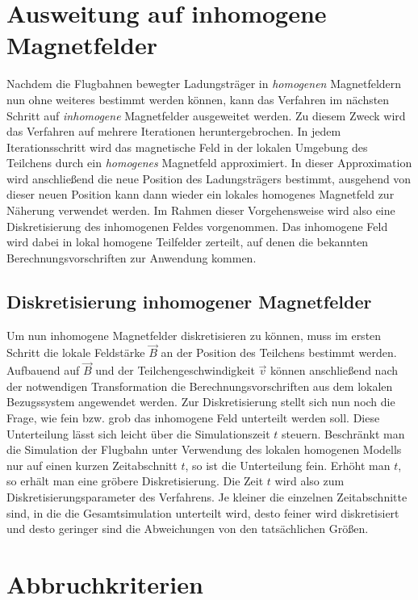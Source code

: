 \section{Ausweitung auf inhomogene Magnetfelder}

Nachdem die Flugbahnen bewegter Ladungstr\"ager in \textit{homogenen} Magnetfeldern nun ohne weiteres bestimmt werden k\"onnen, kann
das Verfahren im n\"achsten Schritt auf \textit{inhomogene} Magnetfelder ausgeweitet werden. Zu diesem Zweck wird das Verfahren
auf mehrere Iterationen heruntergebrochen. In jedem Iterationsschritt wird das magnetische Feld in der lokalen Umgebung des Teilchens
durch ein \textit{homogenes} Magnetfeld approximiert. In dieser Approximation wird anschlie{\ss}end die neue Position des
Ladungstr\"agers bestimmt, ausgehend von dieser neuen Position kann dann wieder ein lokales homogenes Magnetfeld zur N\"aherung
verwendet werden. Im Rahmen dieser Vorgehensweise wird also eine Diskretisierung des inhomogenen Feldes vorgenommen. Das inhomogene
Feld wird dabei in lokal homogene Teilfelder zerteilt, auf denen die bekannten Berechnungsvorschriften zur Anwendung kommen.

\subsection{Diskretisierung inhomogener Magnetfelder}

Um nun inhomogene Magnetfelder diskretisieren zu k\"onnen, muss im ersten Schritt die lokale Feldst\"arke \(\vec{B}\) an der Position
des Teilchens bestimmt werden. Aufbauend auf \(\vec{B}\) und der Teilchengeschwindigkeit \(\vec{v}\) k\"onnen anschlie{\ss}end nach
der notwendigen Transformation die Berechnungsvorschriften aus dem lokalen Bezugssystem angewendet werden. Zur Diskretisierung stellt
sich nun noch die
Frage, wie fein bzw. grob das inhomogene Feld unterteilt werden soll. Diese Unterteilung l\"asst sich leicht \"uber die
Simulationszeit \(t\) steuern. Beschr\"ankt man die Simulation der Flugbahn unter
Verwendung des lokalen homogenen Modells nur auf einen kurzen Zeitabschnitt \(t\), so ist die Unterteilung fein. Erh\"oht man \(t\),
so erh\"alt man eine gr\"obere Diskretisierung. Die Zeit \(t\) wird also zum Diskretisierungsparameter des Verfahrens. Je kleiner
die einzelnen Zeitabschnitte sind, in die die Gesamtsimulation unterteilt wird, desto feiner wird diskretisiert und desto geringer
sind die Abweichungen von den tats\"achlichen Gr\"o{\ss}en.

\section{Abbruchkriterien}

